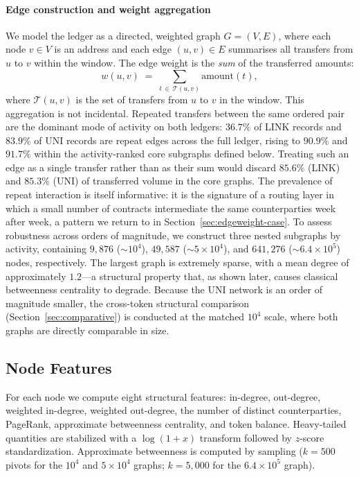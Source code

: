 \documentclass[final,5p,times]{elsarticle}
\begin{document}
\paragraph{Edge construction and weight aggregation}
We model the ledger as a directed, weighted graph $G = (V, E)$, where each
node $v \in V$ is an address and each edge $(u, v) \in E$ summarises all
transfers from $u$ to $v$ within the window. The edge weight is the
\emph{sum} of the transferred amounts:
\begin{equation}
w(u,v) \;=\; \sum_{t \,\in\, \mathcal{T}(u,v)} \mathrm{amount}(t),
\label{eq:edgeweight}
\end{equation}
where $\mathcal{T}(u,v)$ is the set of transfers from $u$ to $v$ in the
window. This aggregation is not incidental. Repeated transfers between the
same ordered pair are the dominant mode of activity on both ledgers:
$36.7\%$ of LINK records and $83.9\%$ of UNI records are repeat edges across
the full ledger, rising to $90.9\%$ and $91.7\%$ within the activity-ranked
core subgraphs defined below. Treating such an edge as a single transfer
rather than as their sum would discard $85.6\%$ (LINK) and $85.3\%$ (UNI) of
transferred volume in the core graphs. The prevalence of repeat interaction
is itself informative: it is the signature of a routing layer in which a
small number of contracts intermediate the same counterparties week after
week, a pattern we return to in Section~\ref{sec:edgeweight-case}. To assess
robustness across orders of magnitude, we construct three nested subgraphs
by activity, containing $9{,}876$ ($\sim\!10^4$), $49{,}587$
($\sim\!5\times10^4$), and $641{,}276$ ($\sim\!6.4\times10^5$) nodes,
respectively. The largest graph is extremely sparse, with a mean degree of
approximately $1.2$---a structural property that, as shown later, causes
classical betweenness centrality to degrade. Because the UNI network is an
order of magnitude smaller, the cross-token structural comparison
(Section~\ref{sec:comparative}) is conducted at the matched $10^4$ scale,
where both graphs are directly comparable in size.

\subsection{Node Features}
\label{sec:features}
For each node we compute eight structural features: in-degree, out-degree,
weighted in-degree, weighted out-degree, the number of distinct
counterparties, PageRank, approximate betweenness centrality, and token
balance. Heavy-tailed quantities are stabilized with a $\log(1+x)$
transform followed by $z$-score standardization. Approximate betweenness is
computed by sampling ($k = 500$ pivots for the $10^4$ and $5\times10^4$
graphs; $k = 5{,}000$ for the $6.4\times10^5$ graph).
\end{document}
